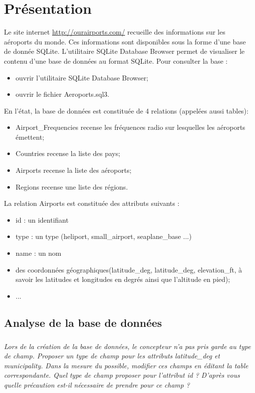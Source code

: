 \documentclass[10pt]{article}
\begin{document}




\section*{Présentation}
Le site internet \url{http://ourairports.com/} recueille des informations sur les aéroports du monde. Ces informations sont disponibles sous la forme d'une base de donnée SQLite. 
L'utilitaire SQLite Database Browser permet de visualiser le contenu d'une base de données au format SQLite. Pour consulter la base :

\begin{itemize}%
\item ouvrir l'utilitaire SQLite Database Browser;
\item ouvrir le fichier \textsf{Aeroports.sql3}.
\end{itemize}

En l'état, la base de données est constituée de 4 relations (appelées aussi tables): 
\begin{itemize}
\item \textsf{Airport\_Frequencies} recense les fréquences radio sur lesquelles les aéroports émettent;
\item \textsf{Countries} recense la liste des pays;
\item \textsf{Airports} recense la liste des aéroports;
\item \textsf{Regions} recense une liste des régions.
\end{itemize}



La relation \textsf{Airports} est constituée des attributs suivants : 
\begin{itemize}
\item \textsf{id} : un identifiant
\item \textsf{type} : un type (heliport, small\_airport, seaplane\_base ...)
\item \textsf{name} : un nom
\item des coordonnées géographiques(\textsf{latitude\_deg}, \textsf{latitude\_deg}, \textsf{elevation\_ft}, à savoir les latitudes et longitudes en degrés ainsi que l'altitude en pied);
\item ...
\end{itemize}

\subsection*{Analyse de la base de données}
\subparagraph{}
\textit{Lors de la création de la base de données, le concepteur n'a pas pris garde au type de champ. Proposer un type de champ pour les attributs \textsf{latitude\_deg} et \textsf{municipality}. Dans la mesure du possible, modifier ces champs en éditant la table correspondante. Quel type de champ proposer pour l'attribut \textsf{id} ? D'après vous quelle précaution est-il nécessaire de prendre pour ce champ ?}
\end{document}
